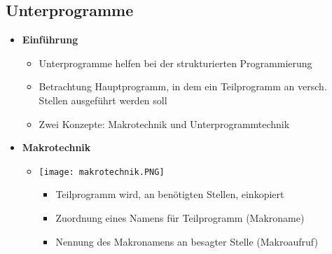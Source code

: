 \subsection{Unterprogramme}
    \begin{itemize}
        \item \textbf{Einführung}
            \begin{itemize}
                \item Unterprogramme helfen bei der strukturierten Programmierung
                \item Betrachtung Hauptprogramm, in dem ein Teilprogramm an versch. Stellen ausgeführt werden soll
                \item Zwei Konzepte: Makrotechnik und Unterprogrammtechnik
            \end{itemize}

        \item \textbf{Makrotechnik}
            \begin{itemize}
                \item[]
                    \begin{minipage}{0.25\textwidth}
                        \texttt{[image: makrotechnik.PNG]}
                    \end{minipage}
                    \begin{minipage}{0.65\textwidth}
                        \begin{itemize}
                            \item Teilprogramm wird, an benötigten Stellen, einkopiert
                            \item Zuordnung eines Namens für Teilprogramm (Makroname)
                            \item Nennung des Makronamens an besagter Stelle (Makroaufruf)
                        \end{itemize}
                    \end{minipage}
            \end{itemize}


\end{itemize}
